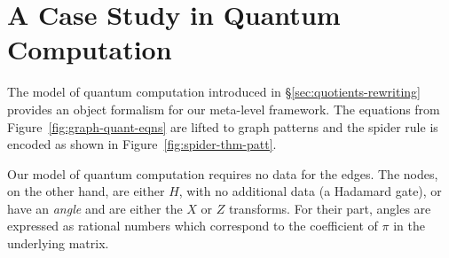 \documentclass[runningheads]{llncs}
\begin{document}








\section{A Case Study in Quantum Computation}
\label{sec:case-study}

The model of quantum computation introduced in
\S\ref{sec:quotients-rewriting} provides an object formalism for our
meta-level framework. The equations from
Figure~\ref{fig:graph-quant-eqns} are lifted to graph patterns and the
spider rule is encoded as shown in Figure~\ref{fig:spider-thm-patt}.


Our model of quantum computation requires no data for the edges. The
nodes, on the other hand, are either $H$, with no additional data (a
Hadamard gate), or have an \emph{angle} and are either the $X$ or $Z$
transforms. For their part, angles are expressed as rational numbers
which correspond to the coefficient of $\pi$ in the underlying matrix.
\end{document}
